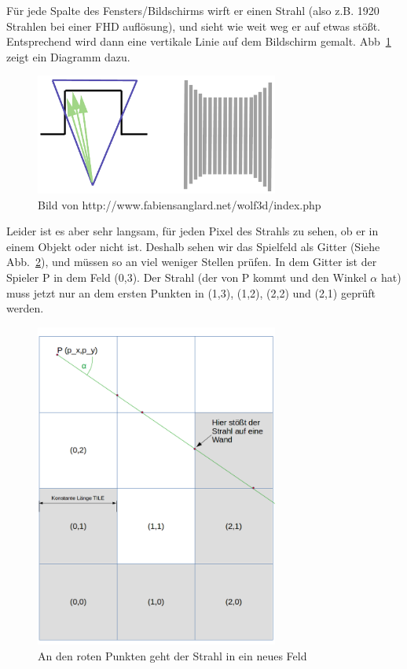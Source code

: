 \documentclass[a4paper,12pt]{report}
\begin{document}
Für jede Spalte des Fensters/Bildschirms wirft er einen Strahl (also z.B. 1920 Strahlen bei einer FHD auflösung), und sieht wie weit weg er auf etwas stößt. Entsprechend wird dann eine vertikale Linie auf dem Bildschirm gemalt. Abb~\ref{fig:rcaster} zeigt ein Diagramm dazu.
\begin{figure}[htbp] 
        \centering
        \includegraphics[width=8cm]{raycasting.png} 
        \caption{Bild von http://www.fabiensanglard.net/wolf3d/index.php}
        \label{fig:rcaster}
\end{figure}

Leider ist es aber sehr langsam, für jeden Pixel des Strahls zu sehen, ob er in einem Objekt oder nicht ist. Deshalb sehen wir das Spielfeld als Gitter (Siehe Abb.~\ref{fig:grid}), und müssen so an viel weniger Stellen prüfen. In dem Gitter ist der Spieler P in dem Feld (0,3). Der Strahl (der von P kommt und den Winkel $\alpha$ hat) muss jetzt nur an dem ersten Punkten in (1,3), (1,2), (2,2) und (2,1) geprüft werden.
\begin{figure}[htbp]
        \centering
        \includegraphics[width=8cm]{grid.png} 
        \caption{An den roten Punkten geht der Strahl in ein neues Feld}
        \label{fig:grid}
\end{figure}
\end{document}
